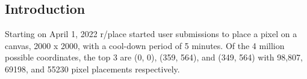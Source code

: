 \begin{center}
\section*{Introduction}
\end{center}
Starting on April 1, 2022 r/place started user submissions to place a pixel on a canvas, 2000 x 2000, with a cool-down period of 5 minutes. Of the 4 million possible coordinates, the top 3 are (0, 0), (359, 564), and (349, 564) with 98,807, 69198, and 55230 pixel placements respectively.
